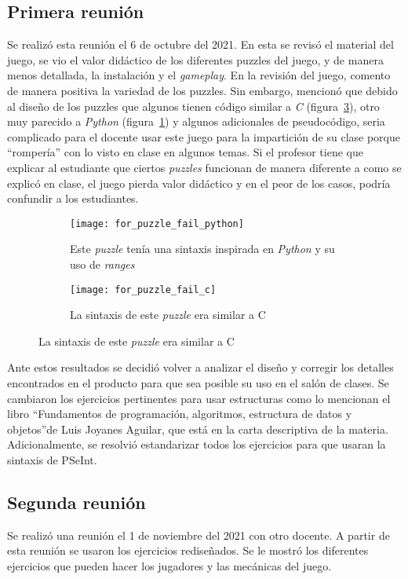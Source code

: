 \subsection{Primera reunión}
Se realizó esta reunión el 6 de octubre del 2021. En esta se revisó el material del juego, se vio el valor didáctico de los diferentes puzzles del juego, y de manera menos detallada, la instalación y el \textit{gameplay}. En la revisión del juego, comento de manera positiva la variedad de los puzzles. Sin embargo, mencionó que debido al diseño de los puzzles que algunos tienen código similar a \textit{C} (figura~\ref{fig:for_puzzle_fail_c}), otro muy parecido a \textit{Python} (figura~\ref{fig:for_puzzle_fail_python}) y algunos adicionales de pseudocódigo, seria complicado para el docente usar este juego para la impartición de su clase porque ``rompería'' con lo visto en clase en algunos temas. Si el profesor tiene que explicar al estudiante que ciertos \textit{puzzles} funcionan de manera diferente a como se explicó en clase, el juego pierda valor didáctico y en el peor de los casos, podría confundir a los estudiantes.
\begin{figure}
    \centering
    \begin{subfigure}{0.4\textwidth}
         \centering
         \texttt{[image: for\_puzzle\_fail\_python]}
         \caption{Este \textit{puzzle} tenía una sintaxis inspirada en \textit{Python} y su uso de \textit{ranges}}
         \label{fig:for_puzzle_fail_python}
     \end{subfigure}
         \begin{subfigure}{0.4\textwidth}
         \centering
         \texttt{[image: for\_puzzle\_fail\_c]}
         \caption{La sintaxis de este \textit{puzzle} era similar a C}
         \label{fig:for_puzzle_fail_c}
     \end{subfigure}
\end{figure}

Ante estos resultados se decidió volver a analizar el diseño y corregir los detalles encontrados en el producto para que sea posible su uso en el salón de clases. Se cambiaron los ejercicios pertinentes para usar estructuras como lo mencionan el libro \textquotedblleft Fundamentos de programación, algoritmos, estructura de datos y objetos\textquotedblright de Luis Joyanes Aguilar, que está en la carta descriptiva de la materia. Adicionalmente, se resolvió estandarizar todos los ejercicios para que usaran la sintaxis de PSeInt. 

\subsection{Segunda reunión}
Se realizó una reunión el 1 de noviembre del 2021 con otro docente. A partir de esta reunión se usaron los ejercicios rediseñados. Se le mostró los diferentes ejercicios que pueden hacer los jugadores y las mecánicas del juego.

